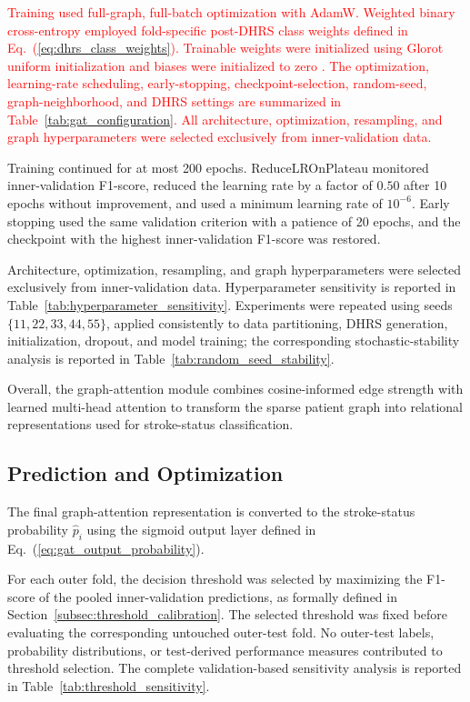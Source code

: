 \documentclass[pdflatex,sn-mathphys-num]{sn-jnl}%
\theoremstyle{thmstyleone}%
\theoremstyle{thmstyletwo}%
\theoremstyle{thmstylethree}%
\begin{document}
\textcolor{red}{
Training used full-graph, full-batch optimization with AdamW. Weighted binary
cross-entropy employed fold-specific post-DHRS class weights defined in
Eq.~(\ref{eq:dhrs_class_weights}). Trainable weights were initialized using
Glorot uniform initialization and biases were initialized to zero
\cite{glorot2010understanding}.
}
\textcolor{red}{
The optimization, learning-rate scheduling, early-stopping, checkpoint-selection,
random-seed, graph-neighborhood, and DHRS settings are summarized in
Table~\ref{tab:gat_configuration}. All architecture, optimization, resampling,
and graph hyperparameters were selected exclusively from inner-validation
data.
}

 {
Training continued for at most 200 epochs. ReduceLROnPlateau monitored
inner-validation F1-score, reduced the learning rate by a factor of \(0.50\)
after 10 epochs without improvement, and used a minimum learning rate of
\(10^{-6}\). Early stopping used the same validation criterion with a
patience of 20 epochs, and the checkpoint with the highest inner-validation
F1-score was restored.
}

 {
Architecture, optimization, resampling, and graph hyperparameters were
selected exclusively from inner-validation data. Hyperparameter sensitivity
is reported in Table~\ref{tab:hyperparameter_sensitivity}. Experiments were
repeated using seeds \(\{11,22,33,44,55\}\), applied consistently to data
partitioning, DHRS generation, initialization, dropout, and model training;
the corresponding stochastic-stability analysis is reported in
Table~\ref{tab:random_seed_stability}.
}

Overall, the graph-attention module combines cosine-informed edge strength
with learned multi-head attention to transform the sparse patient graph into
relational representations used for stroke-status classification.

\subsection{Prediction and Optimization}
\label{subsec:prediction}

The final graph-attention representation is converted to the stroke-status
probability \(\widehat{p}_i\) using the sigmoid output layer defined in
Eq.~(\ref{eq:gat_output_probability}).

 {
For each outer fold, the decision threshold was selected by maximizing the
F1-score of the pooled inner-validation predictions, as formally defined in
Section~\ref{subsec:threshold_calibration}. The selected threshold was fixed
before evaluating the corresponding untouched outer-test fold. No outer-test
labels, probability distributions, or test-derived performance measures
contributed to threshold selection. The complete validation-based sensitivity
analysis is reported in Table~\ref{tab:threshold_sensitivity}.
}
\end{document}
